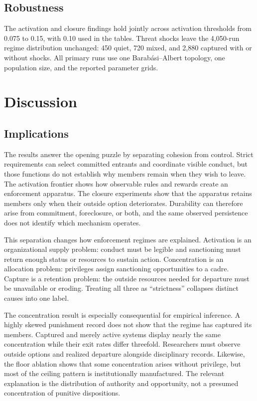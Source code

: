 \documentclass[12pt]{article}
\begin{document}
\subsection{Robustness}

The activation and closure findings hold jointly across activation thresholds from 0.075 to
0.15, with 0.10 used in the tables. Threat shocks leave the 4,050-run regime distribution
unchanged: 450 quiet, 720 mixed, and 2,880 captured with or without shocks. All primary runs use
one Barab\'asi--Albert topology, one population size, and the reported parameter grids.

\section{Discussion}

\subsection{Implications}

The results answer the opening puzzle by separating cohesion from control. Strict requirements can select committed
entrants and coordinate visible conduct, but those functions do not establish why members remain when they wish to
leave. The activation frontier shows how observable rules and rewards create an enforcement apparatus. The closure
experiments show that the apparatus retains members only when their outside option deteriorates. Durability can
therefore arise from commitment, foreclosure, or both, and the same observed persistence does not identify which
mechanism operates.

This separation changes how enforcement regimes are explained. Activation is an organizational supply problem: conduct
must be legible and sanctioning must return enough status or resources to sustain action. Concentration is an allocation
problem: privileges assign sanctioning opportunities to a cadre. Capture is a retention problem: the outside resources
needed for departure must be unavailable or eroding. Treating all three as ``strictness'' collapses distinct causes into
one label.

The concentration result is especially consequential for empirical inference. A highly skewed punishment record does not
show that the regime has captured its members. Captured and merely active systems display nearly the same concentration
while their exit rates differ threefold. Researchers must observe outside options and realized departure alongside
disciplinary records. Likewise, the floor ablation shows that some concentration arises without privilege, but most of
the ceiling pattern is institutionally manufactured. The relevant explanation is the distribution of authority and
opportunity, not a presumed concentration of punitive dispositions.
\end{document}
